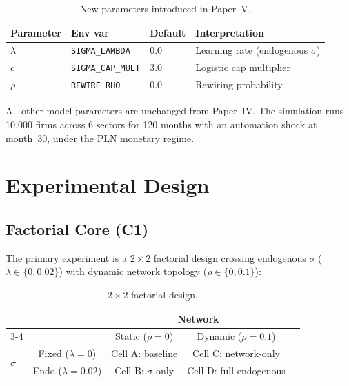 \documentclass[12pt,a4paper]{article}
\begin{document}
\begin{table}[htbp]
\centering
\small
\caption{New parameters introduced in Paper~V.}\label{tab:params}
\begin{tabular}{llll}
\toprule
\textbf{Parameter} & \textbf{Env var} & \textbf{Default} & \textbf{Interpretation} \\
\midrule
$\lambda$ & \texttt{SIGMA\_LAMBDA} & 0.0 & Learning rate (endogenous $\sigma$) \\
$c$ & \texttt{SIGMA\_CAP\_MULT} & 3.0 & Logistic cap multiplier \\
$\rho$ & \texttt{REWIRE\_RHO} & 0.0 & Rewiring probability \\
\bottomrule
\end{tabular}
\end{table}

All other model parameters are unchanged from Paper~IV. The simulation
runs 10,000 firms across 6 sectors for 120 months with an automation
shock at month~30, under the PLN monetary regime.


\section{Experimental Design}\label{sec:method}

\subsection{Factorial Core (C1)}\label{sec:c1}

The primary experiment is a $2 \times 2$ factorial design crossing
endogenous $\sigma$ ($\lambda \in \{0, 0.02\}$) with dynamic network
topology ($\rho \in \{0, 0.1\}$):

\begin{table}[htbp]
\centering
\small
\caption{$2 \times 2$ factorial design.}\label{tab:factorial}
\begin{tabular}{lcccc}
\toprule
& & \multicolumn{2}{c}{\textbf{Network}} \\
\cmidrule(lr){3-4}
& & Static ($\rho=0$) & Dynamic ($\rho=0.1$) \\
\midrule
\multirow{2}{*}{\textbf{$\sigma$}}
  & Fixed ($\lambda=0$) & Cell A: baseline & Cell C: network-only \\
  & Endo ($\lambda=0.02$) & Cell B: $\sigma$-only & Cell D: full endogenous \\
\bottomrule
\end{tabular}
\end{table}
\end{document}
